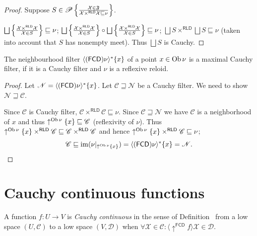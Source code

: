 \begin{proof}
  Suppose $S \in \mathscr{P} \left\{ \frac{ \mathcal{X} \in \mathfrak{F} }{ \mathcal{X}
  \times^{\mathsf{RLD}} \mathcal{X} \sqsubseteq \nu }\right\}$.
  
  $\bigsqcup \setcond{ \mathcal{X} \times^{\mathsf{RLD}} \mathcal{X}}
  {\mathcal{X} \in S } \sqsubseteq \nu$;
  $\bigsqcup \setcond{ \mathcal{X} \times^{\mathsf{RLD}} \mathcal{X}}
  {\mathcal{X} \in S } \circ \bigsqcup
  \setcond{ \mathcal{X} \times^{\mathsf{RLD}} \mathcal{X} }
  {\mathcal{X} \in S} \sqsubseteq \nu$; $\bigsqcup S
  \times^{\mathsf{RLD}} \bigsqcup S \sqsubseteq \nu$ (taken into
  account that $S$ has nonempty meet). Thus $\bigsqcup S$ is Cauchy.
\end{proof}

\begin{prop}
  The neighbourhood filter $\langle (\mathsf{FCD}) \nu \rangle^{\ast} \{
  x \}$ of a point $x \in \operatorname{Ob} \nu$ is a maximal Cauchy filter, if it is a
  Cauchy filter and $\nu$ is a reflexive reloid.
\end{prop}

\begin{proof}
  Let $\mathscr{N} = \langle (\mathsf{FCD}) \nu \rangle^{\ast} \{ x
  \}$. Let $\mathscr{C \sqsupseteq N}$ be a Cauchy filter. We need to show
  $\mathscr{N \sqsupseteq C}$.
  
  Since $\mathscr{C}$ is Cauchy filter, $\mathscr{C}
  \times^{\mathsf{RLD}} \mathscr{C} \sqsubseteq \nu$. Since $\mathscr{C
  \sqsupseteq N}$ we have $\mathscr{C}$ is a neighborhood of $x$ and thus
  $\uparrow^{\operatorname{Ob} \nu} \{ x \} \sqsubseteq \mathscr{C}$ (reflexivity of
  $\nu$). Thus $\uparrow^{\operatorname{Ob} \nu} \{ x \} \times^{\mathsf{RLD}}
  \mathscr{C} \sqsubseteq \mathscr{C} \times^{\mathsf{RLD}}
  \mathscr{C}$ and hence $\uparrow^{\operatorname{Ob} \nu} \{ x \}
  \times^{\mathsf{RLD}} \mathscr{C} \sqsubseteq \nu$;
  \[ \mathscr{C} \sqsubseteq \operatorname{im} (\nu |_{\uparrow^{\operatorname{Ob} \nu} \{ x
     \}}) = \langle (\mathsf{FCD}) \nu \rangle^{\ast} \{ x \} =
     \mathscr{N} . \]
\end{proof}

\section{Cauchy continuous functions}

\begin{defn}
  A function $f : U \rightarrow V$ is \emph{Cauchy continuous} in the
  sense of Definition~ from a low
  space $\left( U , \mathscr{C} \right)$ to a low space
  $\left( V , \mathscr{D} \right)$ when $\forall \mathcal{X} \in \mathscr{C} :
  \langle \uparrow^{\mathsf{FCD}} f \rangle \mathcal{X} \in
  \mathscr{D}$.
\end{defn}

